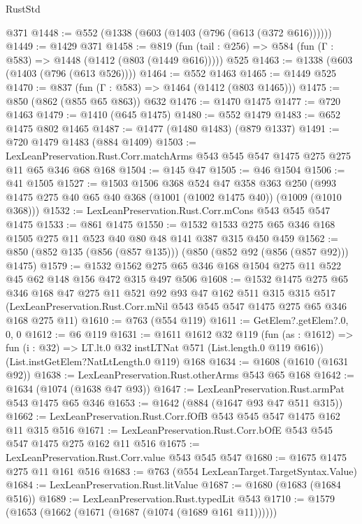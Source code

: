 \begin{lexlean}{RustStd}
\begin{coremodule}
    @371
@1448 := @552 (@1338 (@603 (@1403 (@796 (@613 (@372 @616))))))
@1449 := @1429 @371
@1458 := @819 (fun (tail : @256) => @584 (fun (Γ : @583) => @1448 (@1412 (@803 (@1449 @616))))) @525
@1463 := @1338 (@603 (@1403 (@796 (@613 @526))))
@1464 := @552 @1463
@1465 := @1449 @525
@1470 := @837 (fun (Γ : @583) => @1464 (@1412 (@803 @1465)))
@1475 := @850 (@862 (@855 @65 @863)) @632
@1476 := @1470 @1475
@1477 := @720 @1463
@1479 := @1410 (@645 @1475)
@1480 := @552 @1479
@1483 := @652 @1475 @802 @1465
@1487 := @1477 (@1480 @1483) (@879 @1337)
@1491 := @720 @1479 @1483 (@884 @1409)
@1503 := LexLeanPreservation.Rust.Corr.matchArms
    @543
    @545
    @547
    @1475
    @275
    @275
    @11
    @65
    @346
    @68
    @168
@1504 := @145 @47
@1505 := @46 @1504
@1506 := @41 @1505
@1527 := @1503
    @1506
    @368
    @524
    @47
    @358
    @363
    @250
    (@993 @1475 @275 @40 @65 @40 @368 (@1001 (@1002 @1475 @40)) (@1009 (@1010 @368)))
@1532 := LexLeanPreservation.Rust.Corr.mCons @543 @545 @547 @1475
@1533 := @861 @1475
@1550 := @1532 @1533 @275 @65 @346 @168 @1505 @275 @11 @523 @40 @80 @48 @141 @387 @315 @450 @459
@1562 := @850 (@852 @135 (@856 (@857 @135))) (@850 (@852 @92 (@856 (@857 @92))) @1475)
@1579 := @1532 @1562 @275 @65 @346 @168 @1504 @275 @11 @522 @45 @62 @148 @156 @472 @315 @497 @506
@1608 := @1532
    @1475
    @275
    @65
    @346
    @168
    @47
    @275
    @11
    @521
    @92
    @93
    @47
    @162
    @511
    @315
    @315
    @517
    (LexLeanPreservation.Rust.Corr.mNil @543 @545 @547 @1475 @275 @65 @346 @168 @275 @11)
@1610 := @763 (@554 @119)
@1611 := GetElem?.getElem?.{0, 0, 0}
@1612 := @6 @119
@1631 := @1611
    @1612
    @32
    @119
    (fun (as : @1612) => fun (i : @32) => LT.lt.{0} @32 instLTNat @571 (List.length.{0} @119 @616))
    (List.instGetElem?NatLtLength.{0} @119)
    @168
@1634 := @1608 (@1610 (@1631 @92))
@1638 := LexLeanPreservation.Rust.otherArms @543 @65 @168
@1642 := @1634 (@1074 (@1638 @47 @93))
@1647 := LexLeanPreservation.Rust.armPat @543 @1475 @65 @346
@1653 := @1642 (@884 (@1647 @93 @47 @511 @315))
@1662 := LexLeanPreservation.Rust.Corr.fOfB @543 @545 @547 @1475 @162 @11 @315 @516
@1671 := LexLeanPreservation.Rust.Corr.bOfE @543 @545 @547 @1475 @275 @162 @11 @516
@1675 := LexLeanPreservation.Rust.Corr.value @543 @545 @547
@1680 := @1675 @1475 @275 @11 @161 @516
@1683 := @763 (@554 LexLeanTarget.TargetSyntax.Value)
@1684 := LexLeanPreservation.Rust.litValue
@1687 := @1680 (@1683 (@1684 @516))
@1689 := LexLeanPreservation.Rust.typedLit @543
@1710 := @1579
    (@1653 (@1662 (@1671 (@1687 (@1074 (@1689 @161 @11))))))

\end{coremodule}
\end{lexlean}
